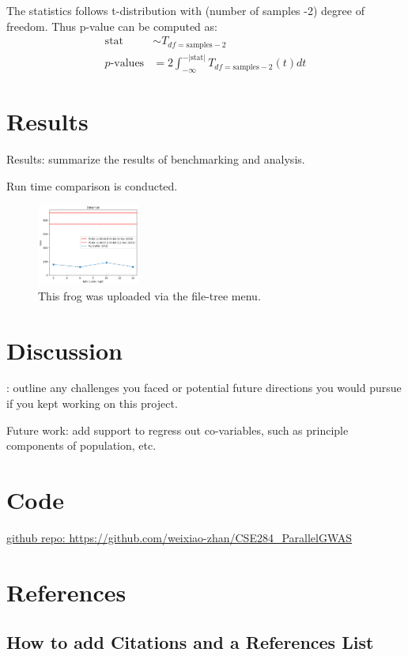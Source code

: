 \documentclass{article}
\begin{document}
The statistics follows t-distribution with (number of samples -2) degree of freedom.
Thus p-value can be computed as:
$$
\begin{aligned}\text{stat} &\sim T_{df=\text{samples} -2}\\ p\text{-values} &=2\int^{-|\text{stat} |}_{-\infty } T_{df=\text{samples} -2}(t)dt\end{aligned}
$$

\section{Results}
Results: summarize the results of benchmarking and analysis.

Run time comparison is conducted.


\begin{figure}[h]
      \centering
      \includegraphics[width=0.3\textwidth]{../datahub.png}
      \caption{\label{fig:frog}This frog was uploaded via the file-tree menu.}
\end{figure}


\section{Discussion}
: outline any challenges you faced or potential future directions you would pursue if you kept working on this project.

Future work: add support to regress out co-variables, such as 
principle components of population, etc.

\section{Code}
\href{https://github.com/weixiao-zhan/CSE284_ParallelGWAS}
{github repo: https://github.com/weixiao-zhan/CSE284\_ParallelGWAS}

\section{References}



\subsection{How to add Citations and a References List}
\end{document}
